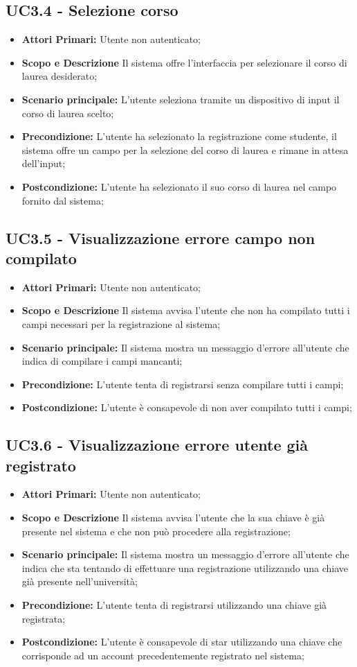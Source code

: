 \documentclass[AnalisiDeiRequisiti.tex]{subfiles}
\begin{document}
\subsection{UC3.4 - Selezione corso}
\begin{itemize}
	\item \textbf{Attori Primari:} Utente non autenticato;
	\item \textbf{Scopo e Descrizione} Il sistema offre l'interfaccia per selezionare il corso di laurea desiderato;
	\item \textbf{Scenario principale:} L'utente seleziona tramite un dispositivo di input il corso di laurea scelto;
	\item \textbf{Precondizione:} L'utente ha selezionato la registrazione come studente, il sistema offre un campo per la selezione del corso di laurea e rimane in attesa dell'input;
	\item \textbf{Postcondizione:} L'utente ha selezionato il suo corso di laurea nel campo fornito dal sistema;
\end{itemize}
\subsection{UC3.5 - Visualizzazione errore campo non compilato}
\begin{itemize}
	\item \textbf{Attori Primari:} Utente non autenticato;
	\item \textbf{Scopo e Descrizione} Il sistema avvisa l'utente che non ha compilato tutti i campi necessari per la registrazione al sistema;
	\item \textbf{Scenario principale:} Il sistema mostra un messaggio d'errore all'utente che indica di compilare i campi mancanti;
	\item \textbf{Precondizione:} L'utente tenta di registrarsi senza compilare tutti i campi;
	\item \textbf{Postcondizione:} L'utente è consapevole di non aver compilato tutti i campi;
\end{itemize}
\subsection{UC3.6 - Visualizzazione errore utente già registrato}
\begin{itemize}
	\item \textbf{Attori Primari:} Utente non autenticato;
	\item \textbf{Scopo e Descrizione} Il sistema avvisa l'utente che la sua chiave è già presente nel sistema e che non può procedere alla registrazione;
	\item \textbf{Scenario principale:} Il sistema mostra un messaggio d'errore all'utente che indica che sta tentando di effettuare una registrazione utilizzando una chiave già presente nell'università;
	\item \textbf{Precondizione:} L'utente tenta di registrarsi utilizzando una chiave già registrata;
	\item \textbf{Postcondizione:} L'utente è consapevole di star utilizzando una chiave che corrisponde ad un account precedentemente registrato nel sistema;
\end{itemize}
\end{document}
